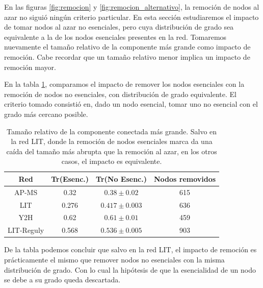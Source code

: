 \par En las figuras \ref{fig:remocion} y \ref{fig:remocion_alternativo}, la remoción de nodos al azar no siguió ningún criterio particular. En esta sección estudiaremos el impacto de tomar nodos al azar no esenciales, pero cuya distribución de grado sea equivalente a la de los nodos esenciales presentes en la red. Tomaremos nuevamente el tamaño relativo de la componente más grande como impacto de remoción. Cabe recordar que un tamaño relativo menor implica un impacto de remoción mayor.
\par En la tabla \ref{table:remocion}, comparamos el impacto de remover los nodos esenciales con la remoción de nodos no esenciales, con distribución de grado equivalente. El criterio tomado consistió en, dado un nodo esencial, tomar uno no esencial con el grado más cercano posible.
\begin{table}
\centering
\caption{Tamaño relativo de la componente conectada más grande. Salvo en la red LIT, donde la remoción de nodos esenciales marca da una caída del tamaño más abrupta que la remoción al azar, en los otros casos, el impacto es equivalente.}
\label{table:remocion}
\begin{tabular}{c c c c}
\hline \hline
Red & Tr(Esenc.) & Tr(No Esenc.) & Nodos removidos \\
\hline
AP-MS & 0.32 & $0.38 \pm 0.02$ & 615 \\
LIT & 0.276 & $0.417 \pm 0.003$ & 636 \\
Y2H & 0.62 & $0.61 \pm 0.01$ & 459 \\
LIT-Reguly & 0.568 & $0.536 \pm 0.005$ & 903 \\
\hline\hline
\end{tabular}
\end{table}
\par De la tabla podemos concluir que salvo en la red LIT, el impacto de remoción es prácticamente el mismo que remover nodos no esenciales con la misma distribución de grado. Con lo cual la hipótesis de que la esencialidad de un nodo se debe a su grado queda descartada.

